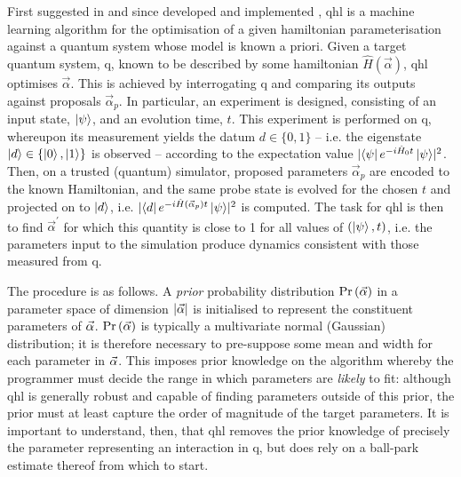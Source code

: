 \glsresetall
First suggested in \cite{Granade:2012kj} and since developed \cite{wiebe2014qhlpra, Wiebe:2014qhl} 
    and implemented \cite{gentile2020learning, wang2017experimental}, 
\gls{qhl} is a machine learning algorithm for the optimisation of a given \gls{hamiltonian} parameterisation 
    against a quantum system whose model is known a priori. 
Given a target quantum system, \gls{q}, known to be described by some \gls{hamiltonian} $\hat{H}(\vec{\alpha})$, 
    \gls{qhl} optimises $\vec{\alpha}$.
This is achieved by interrogating \gls{q} and comparing its outputs against proposals $\vec{\alpha}_p$. 
In particular, an \gls{experiment} is designed, consisting of an input state, $\ket{\psi}$, and an evolution time, $t$.
This \gls{experiment} is performed on \gls{q}, whereupon its measurement yields the datum $d \in \{0, 1\}$ -- 
    i.e. the eigenstate $\ket{d} \in \{ \ket{0}, \ket{1}\}$ is observed -- 
    according to the expectation value $\lvert \bra{\psi} e^{-i \hat{H}_0 t} \ket{\psi} \rvert^2$. 
Then, on a trusted (quantum) simulator, proposed parameters $\vec{\alpha}_p$ are encoded to the 
    known Hamiltonian, and the same \gls{probe} state is evolved for the chosen $t$ and projected on to $\ket{d}$, 
    i.e. $\lvert \bra{d} e^{-i \hat{H}(\vec{\alpha}_p) t } \ket{\psi} \rvert^2 $ is computed.
The task for \gls{qhl} is then to find $\vec{\alpha}^{\prime}$ for which this quantity 
    is close to 1 for all values of $(\ket{\psi}, t)$, 
    i.e. the parameters input to the simulation produce dynamics consistent with those measured from \gls{q}.
\par 

The procedure is as follows. 
A \emph{prior} probability distribution $\Pr\left(\vec{\alpha}\right)$ in a parameter space of dimension $\lvert \vec{\alpha} \rvert$ 
    is initialised to represent the constituent parameters of $\vec{\alpha}$. 
$\Pr\left(\vec{\alpha}\right)$ is typically a multivariate normal (Gaussian) distribution; 
    it is therefore necessary to pre-suppose some mean and width for each parameter in $\vec{\alpha}$. 
This imposes prior knowledge on the algorithm whereby the programmer must decide the range in 
    which parameters are \emph{likely} to fit:
    although \gls{qhl} is generally robust and capable of finding parameters outside of this prior,
    the prior must at least capture the order of magnitude of the target parameters. 
It is important to understand, then, that \gls{qhl} removes the prior knowledge 
    of precisely the parameter representing an interaction in \gls{q}, but does rely on a ball-park estimate thereof from which to start. 
\par 

